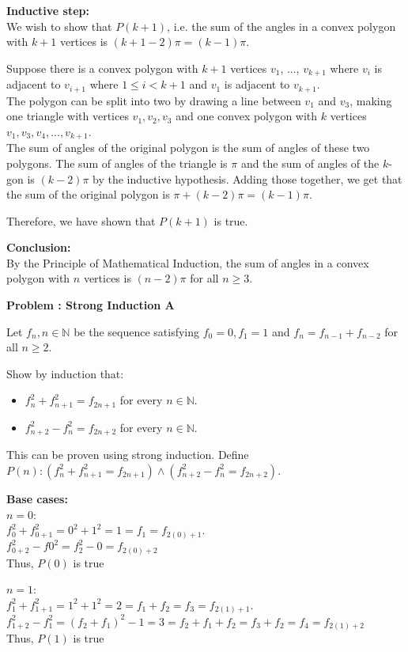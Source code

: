 \documentclass[leqno]{article}
\numberwithin{equation}{section}
\theoremstyle{definition}
\newcounter{parts}
\newcounter{problems}[parts]
\newcommand{\problem}[2]{\stepcounter{problems}
  {\Large \bf \noindent Problem \arabic{problems}: #1 \marginpar{[Total #2 pts]} \\[0.3cm]}}
\begin{document}
\textbf{Inductive step:}\\
We wish to show that $P(k+1)$, i.e. the sum of the angles in a convex polygon with $k + 1$ vertices is $(k+1-2)\pi = (k-1)\pi$.

Suppose there is a convex polygon with $k + 1$ vertices $v_1$, ..., $v_{k+1}$ where $v_i$ is adjacent to $v_{i+1}$ where $1 \leq i < k+1$ and $v_1$ is adjacent to $v_{k+1}$.\\
The polygon can be split into two by drawing a line between $v_1$ and $v_3$, making one triangle with vertices $v_1, v_2, v_3$ and one convex polygon with $k$ vertices $v_1, v_3, v_4, ..., v_{k+1}$.\\
The sum of angles of the original polygon is the sum of angles of these two polygons. The sum of angles of the triangle is $\pi$ and the sum of angles of the $k$-gon is $(k-2)\pi$ by the inductive hypothesis. Adding those together, we get that the sum of the original polygon is $\pi + (k-2)\pi = (k-1)\pi$.

Therefore, we have shown that $P(k+1)$ is true.

\textbf{Conclusion:}\\
By the Principle of Mathematical Induction, the sum of angles in a convex polygon with $n$ vertices is $(n-2)\pi$ for all $n \geq 3$.

\pagebreak

\problem{Strong Induction A}{25}

Let $f_n, n\in \mathbb{N}$ be the sequence satisfying $f_0 = 0, f_1 = 1$ and $f_n = f_{n-1} + f_{n-2}$ for all $n\ge 2$.

Show by induction that:
\begin{itemize}
    \item $f_n^2 + f_{n+1}^2 = f_{2n+1}$ for every $n \in \mathbb{N}$.
    \item $f_{n+2}^2 - f_n^2 = f_{2n+2}$ for every $n \in \mathbb{N}$.
\end{itemize}

This can be proven using strong induction. Define $P(n) \colon (f_n^2 + f_{n+1}^2 = f_{2n+1}) \land (f_{n+2}^2 - f_n^2 = f_{2n+2})$.

\textbf{Base cases:}\\
$n = 0$:\\
$f_0^2 + f_{0+1}^2 = 0^2 + 1^2 = 1 = f_1 = f_{2(0) + 1}$.\\
$f_{0+2}^2 - f{0}^2 = f_{2}^2 - 0 = f_{2(0) + 2}$\\
Thus, $P(0)$ is true

$n = 1$:\\
$f_1^2 + f_{1+1}^2 = 1^2 + 1^2 = 2 = f_1 + f_2 = f_3 = f_{2(1) + 1}$.\\
$f_{1+2}^2 - f_{1}^2 = (f_2 + f_1)^2 - 1 = 3 = f_2 + f_1 + f_2 = f_3 + f_2 = f_4 = f_{2(1) + 2}$\\
Thus, $P(1)$ is true
\end{document}

